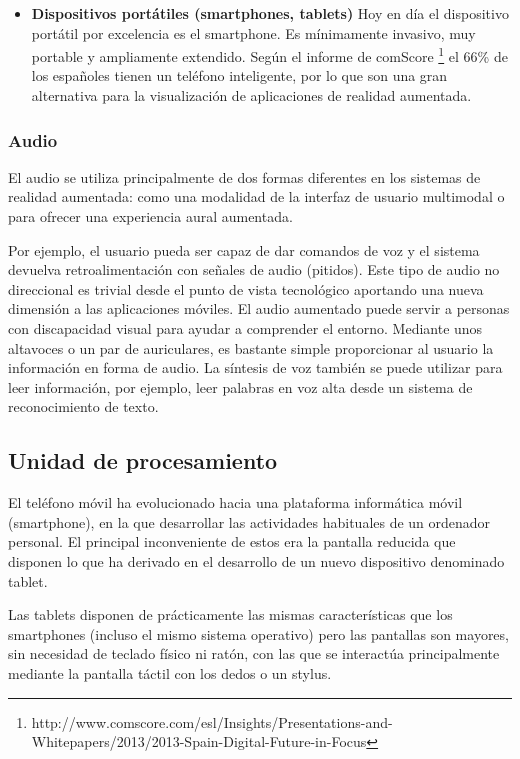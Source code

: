 \begin{itemize}
\item \textbf{Dispositivos portátiles (smartphones, tablets)}
  Hoy en día el dispositivo portátil por excelencia es el smartphone. Es mínimamente invasivo, muy portable y ampliamente extendido. Según el informe de comScore \footnote{http://www.comscore.com/esl/Insights/Presentations-and-Whitepapers/2013/2013-Spain-Digital-Future-in-Focus} el 66\% de los españoles tienen un teléfono inteligente, por lo que son una gran alternativa para la visualización de aplicaciones de realidad aumentada.
\end{itemize}

\subsubsection{Audio}
El audio se utiliza principalmente de dos formas diferentes en los sistemas de realidad aumentada: como una modalidad de la interfaz de usuario multimodal o para ofrecer una experiencia aural aumentada. 

Por ejemplo, el usuario pueda ser capaz de dar comandos de voz y el sistema devuelva retroalimentación con señales de audio (pitidos). Este tipo de audio no direccional es trivial desde el punto de vista tecnológico aportando una nueva dimensión a las aplicaciones móviles. El audio aumentado puede servir a personas con discapacidad visual para ayudar a comprender el entorno. Mediante unos altavoces o un par de auriculares, es bastante simple proporcionar al usuario la información en forma de audio. La síntesis de voz también se puede utilizar para leer información, por ejemplo, leer palabras en voz alta desde un sistema de reconocimiento de texto.

\subsection{Unidad de procesamiento}
El teléfono móvil ha evolucionado hacia una plataforma informática móvil (smartphone), en la que desarrollar las actividades habituales de un ordenador personal. El principal inconveniente de estos era la pantalla reducida que disponen lo que ha derivado en el desarrollo de un nuevo dispositivo denominado tablet. 

Las tablets disponen de prácticamente las mismas características que los smartphones (incluso el mismo sistema operativo) pero las pantallas son mayores, sin necesidad de teclado físico ni ratón, con las que se interactúa principalmente mediante la pantalla táctil con los dedos o un stylus.

